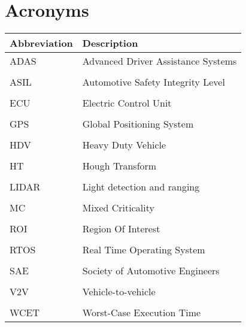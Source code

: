 \chapter*{Acronyms}
\noindent{}\begin{tabular}{l  l}
\toprule
\textbf{Abbreviation} & \textbf{Description} \vspace{0.3em} \\
\midrule
ADAS	&Advanced Driver Assistance Systems\\
\\[-1em]
ASIL	&Automotive Safety Integrity Level\\
\\[-1em]
ECU		&Electric Control Unit\\
\\[-1em]
GPS		&Global Positioning System\\
\\[-1em]
HDV		&Heavy Duty Vehicle\\
\\[-1em]
HT		&Hough Transform\\
\\[-1em]
LIDAR	&Light detection and ranging\\
\\[-1em]
MC		&Mixed Criticality\\
\\[-1em]
ROI		&Region Of Interest\\
\\[-1em]
RTOS	&Real Time Operating System\\
\\[-1em]
SAE		&Society of Automotive Engineers\\
\\[-1em]
V2V		&Vehicle-to-vehicle\\
\\[-1em]
WCET	&Worst-Case Execution Time\\
\bottomrule

\end{tabular}